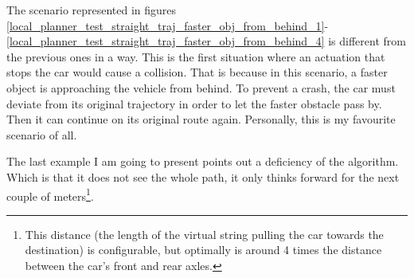 The scenario represented in figures \ref{local_planner_test_straight_traj_faster_obj_from_behind_1}-\ref{local_planner_test_straight_traj_faster_obj_from_behind_4} is different from the previous ones in a way. This is the first situation where an actuation that stops the car would cause a collision. That is because in this scenario, a faster object is approaching the vehicle from behind. To prevent a crash, the car must deviate from its original trajectory in order to let the faster obstacle pass by. Then it can continue on its original route again. Personally, this is my favourite scenario of all.

The last example I am going to present points out a deficiency of the algorithm. Which is that it does not see the whole path, it only thinks forward for the next couple of meters\footnote{This distance (the length of the virtual string pulling the car towards the destination) is configurable, but optimally is around 4 times the distance between the car's front and rear axles.}.

